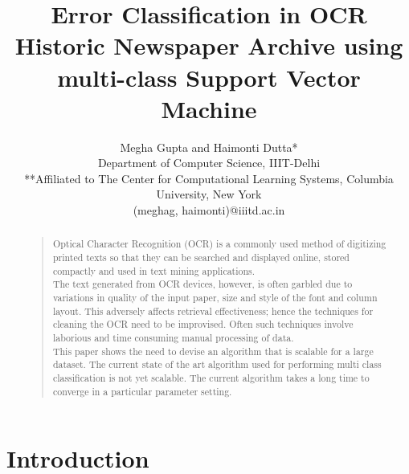 \documentclass[letterpaper]{article}
\begin{document}
%
\title{Error Classification in OCR Historic Newspaper Archive using multi-class Support Vector Machine}


\author{Megha Gupta and Haimonti Dutta*\\
Department of Computer Science, IIIT-Delhi\\
**Affiliated to The Center for Computational Learning Systems, Columbia University, New York\\
(meghag, haimonti)@iiitd.ac.in
}

\maketitle
\begin{abstract}
\begin{quote}
\noindent Optical Character Recognition (OCR) is a commonly used method of digitizing printed texts so that they can be searched and displayed online, stored compactly and used in text mining applications.\\
The text generated from OCR devices, however, is often garbled due to variations in quality of the input paper, size and style of the font and column layout. This adversely affects retrieval effectiveness; hence the techniques for cleaning the OCR need to be improvised. Often such techniques involve laborious and time consuming manual processing of data.\\
This paper shows the need to devise an algorithm that is scalable for a large dataset. The current state of the art algorithm used for performing multi class classification is not yet scalable. The current algorithm takes a long time to converge in a particular parameter setting.

\end{quote}
\end{abstract}

\section{Introduction}
\end{document}
